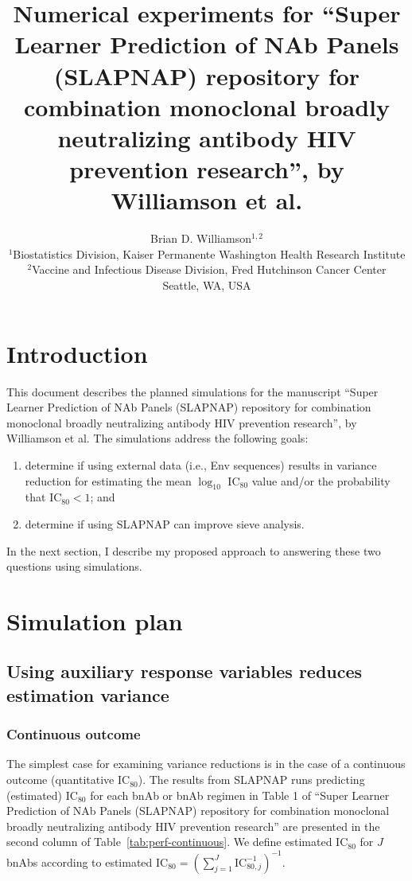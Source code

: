 \documentclass[10pt]{article}
\author{Brian D. Williamson$^{1,2}$ \\
${}^1$Biostatistics Division, Kaiser Permanente Washington Health Research Institute \\
${}^2$Vaccine and Infectious Disease Division, Fred Hutchinson Cancer Center \\
Seattle, WA, USA
}
\title{Numerical experiments for ``Super Learner Prediction of NAb Panels (SLAPNAP) repository for combination monoclonal broadly neutralizing antibody HIV prevention research'', by Williamson et al.}
\date{}
\begin{document}
\maketitle

\section{Introduction}

This document describes the planned simulations for the manuscript ``Super Learner Prediction of NAb Panels (SLAPNAP) repository for combination monoclonal broadly neutralizing antibody HIV prevention research'', by Williamson et al. The simulations address the following goals:
\begin{enumerate}
    \item determine if using external data (i.e., Env sequences) results in variance reduction for estimating the mean $\log_{10}$ IC$_{80}$ value and/or the probability that IC$_{80} < 1$; and
    \item determine if using SLAPNAP \citep{williamson2021} can improve sieve analysis.
\end{enumerate}
In the next section, I describe my proposed approach to answering these two questions using simulations.

\section{Simulation plan}
\subsection{Using auxiliary response variables reduces estimation variance}
\subsubsection{Continuous outcome}
The simplest case for examining variance reductions is in the case of a continuous outcome (quantitative IC$_{80}$). The results from SLAPNAP runs predicting (estimated) IC$_{80}$ for each bnAb or bnAb regimen in Table 1 of ``Super Learner Prediction of NAb Panels (SLAPNAP) repository for combination monoclonal broadly neutralizing antibody HIV prevention research'' are presented in the second column of Table~\ref{tab:perf-continuous}. We define estimated IC$_{80}$ for $J$ bnAbs according to estimated $\text{IC}_{80} = \left(\sum_{j=1}^J \text{IC}_{80,j}^{-1}\right)^{-1}$.
\end{document}
